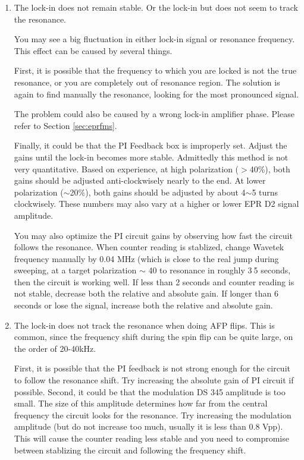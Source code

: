 \begin{enumerate}


\item The lock-in does not remain stable.  
Or the lock-in but does not seem to track the resonance.

You may see a big fluctuation in either lock-in signal or resonance frequency.
This effect can be caused by several things.  

First, it is possible that
the frequency to which you are locked is not the true resonance, or
you are completely out of resonance region.
The solution is again to find manually the resonance, looking for the
most pronounced signal.  

	The problem could also be caused by a wrong lock-in amplifier phase.
Please refer to Section \ref{sec:eprfms}.

	Finally, it could be that the PI Feedback box is improperly set. 
Adjust the gains until the lock-in becomes more stable.  
Admittedly this method is not very quantitative.
Based on experience, at high polarization ($>$40\%), both gains should be adjusted 
anti-clockwisely nearly to the end.  At lower polarization ($\sim$20\%), both gains should
be adjusted by about 4$\sim$5 turns clockwisely.
These numbers may also vary at a higher or lower EPR D2 signal amplitude.

You may also optimize the PI circuit gains by observing how fast the circuit 
follows the resonance.  When counter reading is stablized,
change Wavetek frequency manually by 0.04 MHz (which is close to the real jump
during sweeping, at a target polarization $\sim$ 40%
to resonance in roughly 3$~$5 seconds, then the
circuit is working well.  If less than 2 seconds and counter reading is not stable, 
decrease both the relative and absolute gain.  If longer than 6 seconds or lose the 
signal, increase both the relative and absolute gain. 

\item The lock-in does not track the resonance when doing AFP flips.
This is common, since the frequency shift during the spin flip can be
quite large, on the order of 20-40kHz.  

	First, it is possible that the PI feedback is not strong enough for the circuit
to follow the resonance shift.  Try increasing the absolute gain of PI circuit
if possible.
	Second, it could be that the modulation DS 345 amplitude is too small.  The
size of this amplitude determines how far from the central frequency the circuit 
looks for the resonance.   Try increasing the modulation amplitude (but do not increase 
too much, usually it is less than 0.8 Vpp).  This will cause
the counter reading less stable and you need to compromise between stablizing the
circuit and following the frequency shift.


\end{enumerate}


